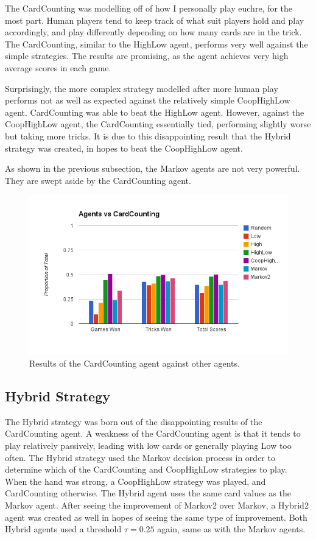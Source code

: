 The CardCounting was modelling off of how I personally play euchre, for the most part. Human players tend to keep track of what suit
players hold and play accordingly, and play differently depending on how many cards are in the trick. The CardCounting, similar to the
HighLow agent, performs very well against the simple strategies. The results are promising, as the agent achieves very high average
scores in each game.

Surprisingly, the more complex strategy modelled after more human play performs not as well as expected against the relatively simple
CoopHighLow agent. CardCounting was able to beat the HighLow agent. However, against the CoopHighLow agent, the CardCounting
essentially tied, performing slightly worse but taking more tricks. It is due to this disappointing result that the Hybrid strategy
was created, in hopes to beat the CoopHighLow agent.

As shown in the previous subsection, the Markov agents are not very powerful. They are swept aside by the CardCounting agent.

\begin{figure}[ht]
    \centering
    \includegraphics[scale=0.5]{data/cardcounting.png}
    \caption{Results of the CardCounting agent against other agents.}
    \label{fig:results_cardcounting}
\end{figure}


\subsection{Hybrid Strategy}

The Hybrid strategy was born out of the disappointing results of the CardCounting agent. A weakness of the CardCounting agent is that
it tends to play relatively passively, leading with low cards or generally playing Low too often. The Hybrid strategy used the Markov
decision process in order to determine which of the CardCounting and CoopHighLow strategies to play. When the hand was strong, a CoopHighLow
strategy was played, and CardCounting otherwise. The Hybrid agent uses the same card values as the Markov agent. After seeing the improvement
of Markov2 over Markov, a Hybrid2 agent was created as well in hopes of seeing the same type of improvement. Both Hybrid agents used
a threshold $\tau=0.25$ again, same as with the Markov agents.

